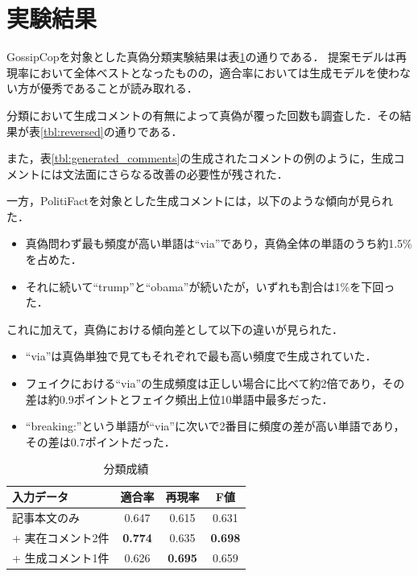 \section{実験結果}
\label{sec:result}
GossipCopを対象とした真偽分類実験結果は表\ref{tbl:classify_results}の通りである．
提案モデルは再現率において全体ベストとなったものの，適合率においては生成モデルを使わない方が優秀であることが読み取れる．

分類において生成コメントの有無によって真偽が覆った回数も調査した．その結果が表\ref{tbl:reversed}の通りである．

また，表\ref{tbl:generated_comments}の生成されたコメントの例のように，生成コメントには文法面にさらなる改善の必要性が残された．

一方，PolitiFactを対象とした生成コメントには，以下のような傾向が見られた．
\begin{itemize}
    \item 真偽問わず最も頻度が高い単語は``via''であり，真偽全体の単語のうち約1.5\%を占めた．
    \item それに続いて``trump''と``obama''が続いたが，いずれも割合は1\%を下回った．
\end{itemize}

これに加えて，真偽における傾向差として以下の違いが見られた．

\begin{itemize}
    \item ``via''は真偽単独で見てもそれぞれで最も高い頻度で生成されていた．
    \item フェイクにおける``via''の生成頻度は正しい場合に比べて約2倍であり，その差は約0.9ポイントとフェイク頻出上位10単語中最多だった．
    \item ``breaking:''という単語が``via''に次いで2番目に頻度の差が高い単語であり，その差は0.7ポイントだった．
\end{itemize}


\begin{table}
    \renewcommand{\arraystretch}{1.3}
    \caption{分類成績}
    \label{tbl:classify_results}
    \centering
    \begin{tabular}{lccc}
        \hline
        入力データ           & 適合率 & 再現率 & F値 \\ \hline
        記事本文のみ         & 0.647     & 0.615  & 0.631    \\
        + 実在コメント2件  & \textbf{0.774}     & 0.635  & \textbf{0.698}    \\
        + 生成コメント1件 & 0.626     & \textbf{0.695}  & 0.659    \\ \hline
    \end{tabular}
\end{table}

